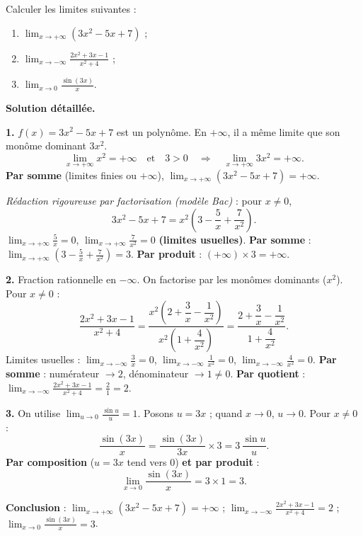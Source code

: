 \documentclass[11pt]{article}
\begin{document}
\begin{exoresolu}
Calculer les limites suivantes :
\begin{enumerate}
\item $\displaystyle\lim_{x\to +\infty}\left(3x^2 - 5x + 7\right)$ ;
\item $\displaystyle\lim_{x\to -\infty}\frac{2x^2 + 3x - 1}{x^2 + 4}$ ;
\item $\displaystyle\lim_{x\to 0}\frac{\sin(3x)}{x}$.
\end{enumerate}
\tcblower
\textbf{Solution détaillée.}

\textbf{1.} $f(x)=3x^2-5x+7$ est un polynôme. En $+\infty$, il a même limite que son monôme dominant $3x^2$.
\[\lim_{x\to+\infty} x^2 = +\infty \quad\text{et}\quad 3>0 \quad\Longrightarrow\quad \lim_{x\to+\infty} 3x^2 = +\infty.\]
\textbf{Par somme} (limites finies ou $+\infty$), $\displaystyle\lim_{x\to+\infty}\left(3x^2-5x+7\right)=+\infty$.

\emph{Rédaction rigoureuse par factorisation (modèle Bac)} : pour $x\neq 0$,
\[3x^2-5x+7 = x^2\left(3-\frac{5}{x}+\frac{7}{x^2}\right).\]
$\displaystyle\lim_{x\to+\infty}\frac{5}{x}=0$, $\displaystyle\lim_{x\to+\infty}\frac{7}{x^2}=0$ \textbf{(limites usuelles)}.
\textbf{Par somme} : $\displaystyle\lim_{x\to+\infty}\left(3-\frac{5}{x}+\frac{7}{x^2}\right)=3$.
\textbf{Par produit} : $(+\infty)\times 3 = +\infty$.

\textbf{2.} Fraction rationnelle en $-\infty$. On factorise par les monômes dominants ($x^2$). Pour $x\neq 0$ :
\[\frac{2x^2+3x-1}{x^2+4}=\frac{x^2\left(2+\dfrac{3}{x}-\dfrac{1}{x^2}\right)}{x^2\left(1+\dfrac{4}{x^2}\right)}=\frac{2+\dfrac{3}{x}-\dfrac{1}{x^2}}{1+\dfrac{4}{x^2}}.\]
Limites usuelles : $\displaystyle\lim_{x\to-\infty}\frac{3}{x}=0$, $\displaystyle\lim_{x\to-\infty}\frac{1}{x^2}=0$, $\displaystyle\lim_{x\to-\infty}\frac{4}{x^2}=0$.
\textbf{Par somme} : numérateur $\to 2$, dénominateur $\to 1 \neq 0$.
\textbf{Par quotient} : $\displaystyle\lim_{x\to-\infty}\frac{2x^2+3x-1}{x^2+4}=\frac{2}{1}=2$.

\textbf{3.} On utilise $\displaystyle\lim_{u\to 0}\frac{\sin u}{u}=1$. Posons $u=3x$ ; quand $x\to 0$, $u\to 0$. Pour $x\neq 0$ :
\[\frac{\sin(3x)}{x}=\frac{\sin(3x)}{3x}\times 3 = 3\,\frac{\sin u}{u}.\]
\textbf{Par composition} ($u=3x$ tend vers $0$) \textbf{et par produit} :
\[\lim_{x\to 0}\frac{\sin(3x)}{x}=3\times 1 = 3.\]

\textbf{Conclusion} : $\displaystyle\lim_{x\to+\infty}(3x^2-5x+7)=+\infty$ ; $\displaystyle\lim_{x\to-\infty}\frac{2x^2+3x-1}{x^2+4}=2$ ; $\displaystyle\lim_{x\to 0}\frac{\sin(3x)}{x}=3$.
\end{exoresolu}
\end{document}
